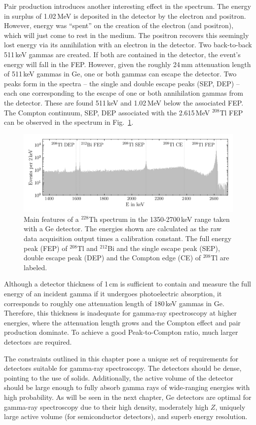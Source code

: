 Pair production introduces another interesting effect in the spectrum. The energy in surplus of 1.02\,MeV is deposited in the detector by the electron and positron. However, energy was ``spent'' on the creation of the electron (and positron), which will just come to rest in the medium. The positron recovers this seemingly lost energy via its annihilation with an electron in the detector. Two back-to-back 511\,keV gammas are created. If both are contained in the detector, the event's energy will fall in the FEP. However, given the roughly 24\,mm attenuation length of 511\,keV gammas in Ge, one or both gammas can escape the detector. Two peaks form in the spectra -- the single and double escape peaks (SEP, DEP) -- each one corresponding to the escape of one or both annihilation gammas from the detector. These are found 511\,keV and 1.02\,MeV below the associated FEP. The Compton continuum, SEP, DEP associated with the 2.615\,MeV $^{208}$Tl FEP can be observed in the spectrum in Fig.~\ref{fig:spectrum_features}.
\begin{figure}[htb]
	\centering
	\includegraphics[width=6in]{figs/gammas/Th228_spectrum_features.png}
	\caption{Main features of a $^{228}$Th spectrum in the 1350-2700\,keV range taken with a Ge detector. The energies shown are calculated as the raw data acquisition output times a calibration constant. The full energy peak (FEP) of $^{208}$Tl and $^{212}$Bi and the single escape peak (SEP), double escape peak (DEP) and the Compton edge (CE) of $^{208}$Tl are labeled.}
	\label{fig:spectrum_features}
\end{figure}

Although a detector thickness of 1\,cm is sufficient to contain and measure the full energy of an incident gamma if it undergoes photoelectric absorption, it corresponds to roughly one attenuation length of 180\,keV gammas in Ge. Therefore, this thickness is inadequate for gamma-ray spectroscopy at higher energies, where the attenuation length grows and the Compton effect and pair production dominate. To achieve a good Peak-to-Compton ratio, much larger detectors are required.

The constraints outlined in this chapter pose a unique set of requirements for detectors suitable for gamma-ray spectroscopy. The detectors should be dense, pointing to the use of solids. Additionally, the active volume of the detector should be large enough to fully absorb gamma rays of wide-ranging energies with high probability. As will be seen in the next chapter, Ge detectors are optimal for gamma-ray spectroscopy due to their high density, moderately high $Z$, uniquely large active volume (for semiconductor detectors), and superb energy resolution.